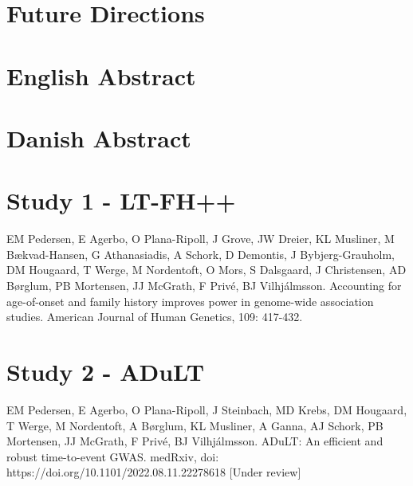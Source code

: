\documentclass[a4paper, twoside]{report}
\begin{document}
\chapter{Future Directions}


\chapter{English Abstract}


\chapter{Danish Abstract}



\nocite{*}
\newpage
\printbibliography[heading=bibintoc,
title={References}]
\newpage



\begin{appendices}
\chapter{Study 1 - LT-FH++}
EM Pedersen, E Agerbo, O Plana-Ripoll, J Grove, JW Dreier, KL Musliner, M Bækvad-Hansen, G Athanasiadis, A Schork, D Demontis, J Bybjerg-Grauholm, DM Hougaard, T Werge, M Nordentoft, O Mors, S Dalsgaard, J Christensen,  AD Børglum, PB Mortensen, JJ McGrath, F Privé, BJ Vilhjálmsson. Accounting for age-of-onset and family history improves power in genome-wide association studies. American Journal of Human Genetics, 109: 417-432.



\chapter{Study 2 - ADuLT}
EM Pedersen, E Agerbo, O Plana-Ripoll, J Steinbach, MD Krebs, DM Hougaard, T Werge, M Nordentoft, A Børglum,  KL Musliner, A Ganna, AJ Schork, PB Mortensen,  JJ McGrath,  F Privé, BJ Vilhjálmsson. ADuLT: An efficient and robust time-to-event GWAS. medRxiv, doi: https://doi.org/10.1101/2022.08.11.22278618 [Under review]


%
%

\end{appendices}
\end{document}
